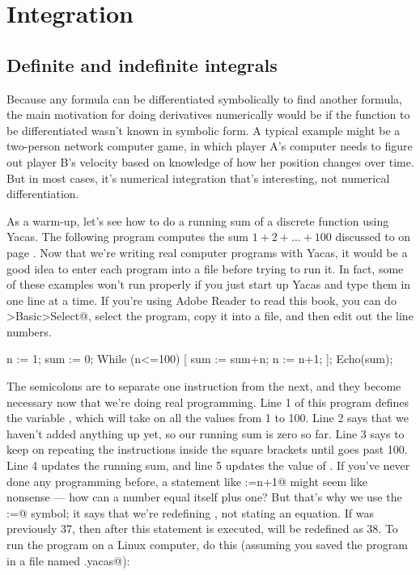 \chapter{Integration}\label{ch:integration}

\section{Definite and indefinite integrals}

Because any formula can be differentiated symbolically to find another formula,
the main motivation for doing derivatives numerically would be if the function to be
differentiated wasn't known in symbolic form.
A typical example might be a two-person network computer game, in which player A's
computer needs to figure out player B's velocity based on knowledge of how her
position changes over time. But in most cases, it's numerical integration that's
interesting, not numerical differentiation.

As a warm-up, let's see how to do a running sum of a discrete function using Yacas.
The following program computes the sum $1+2+\ldots+100$ discussed to on page
\pageref{gauss-story}. Now that we're writing real computer programs with Yacas, it would be a good
idea to enter each program into a file before trying to run it. In fact, some
of these examples won't run properly if you just start up Yacas and type them in
one line at a time. If you're using Adobe Reader to read this book, you can
do \verb@Tools>Basic>Select@, select the program, copy it into a file,
and then edit out the line numbers.

\restartLineNumbers
\begin{eg}
\startcodeeg
\begin{Code}
  \nn n := 1;
  \nn sum := 0;
  \nn While (n<=100) [
  \nn   sum := sum+n;
  \nn   n := n+1;
  \nn ];
  \nn Echo(sum);
\end{Code}
\end{eg}

The semicolons are to separate one instruction from the next, and they become necessary
now that we're doing real programming.
Line 1 of this program defines the variable \verb@n@, which will take on all the values
from 1 to 100. Line 2 says that we haven't added anything up yet, so our running
sum is zero so far. Line 3 says to keep on repeating the instructions inside the
square brackets until \verb@n@ goes past 100. Line 4 updates the running sum, and
line 5 updates the value of \verb@n@. If you've never done any programming before,
a statement like \verb@n:=n+1@ might seem like nonsense --- how can a number equal
itself plus one? But that's why we use the \verb@:=@ symbol; it says that we're redefining
\verb@n@, not stating an equation. If \verb@n@ was previously 37, then after this statement is
executed, \verb@n@ will be redefined as 38.
To run the program on a Linux computer,
do this (assuming you saved the program in a file named \verb@sum.yacas@):

